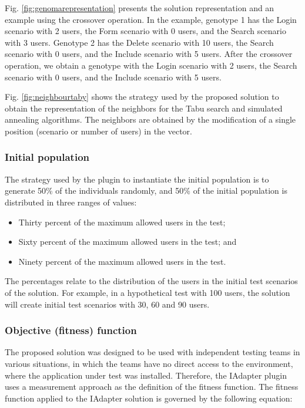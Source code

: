 \documentclass{bmcart}
\begin{document}
Fig. \ref{fig:genomarepresentation} presents the solution representation and an example using the crossover operation. In the example, genotype 1 has the Login scenario with 2 users, the Form scenario with 0 users, and the Search scenario with 3 users. Genotype 2 has the Delete scenario with 10 users, the Search scenario with 0 users, and the Include scenario with 5 users. After the crossover operation, we obtain a genotype with the Login scenario with 2 users, the Search scenario with 0 users, and the Include scenario with 5 users.



Fig. \ref{fig:neighbourtaby} shows the strategy used by the proposed solution to obtain the representation of the neighbors for the Tabu search and simulated annealing algorithms. The neighbors are obtained by the modification of a single position (scenario or number of users) in the vector.





\subsubsection{Initial population}

The strategy used by the plugin to instantiate the initial population is to generate 50\% of the individuals randomly, and 50\% of the initial population is distributed in three ranges of values:

\begin{itemize}
\item Thirty percent of the maximum allowed users in the test;
\item Sixty percent of the maximum allowed users in the test; and
\item Ninety percent of the maximum allowed users in the test.
\end{itemize}

The percentages relate to the distribution of the users in the initial test scenarios of the solution. For example, in a hypothetical test with 100 users, the solution will create initial test scenarios with 30, 60 and 90 users.

\subsubsection{Objective (fitness) function}

The proposed solution was designed to be used with independent testing teams in various situations, in which the teams have no direct access to the environment, where the application under test was installed. Therefore, the IAdapter plugin uses a measurement approach as the definition of the fitness function. The fitness function applied to the IAdapter solution is governed by the following equation:
\end{document}
